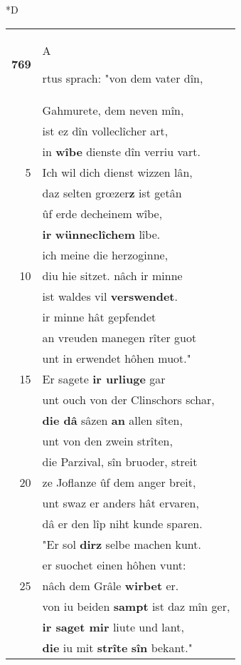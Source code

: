\documentclass[8pt,a4paper,notitlepage]{article}
\begin{document}
\begin{table}[ht]
\begin{minipage}[t]{0.5\linewidth}
\small
\begin{center}*D
\end{center}
\begin{tabular}{rl}
\textbf{769} & \begin{large}A\end{large}rtus sprach: "von dem vater dîn,\\ 
 & Gahmurete, dem neven mîn,\\ 
 & ist ez dîn volleclîcher art,\\ 
 & in \textbf{wîbe} dienste dîn verriu vart.\\ 
5 & Ich wil dich dienst wizzen lân,\\ 
 & daz selten grœzer\textbf{z} ist getân\\ 
 & ûf erde decheinem wîbe,\\ 
 & \textbf{ir} \textbf{wünneclîchem} lîbe.\\ 
 & ich meine die herzoginne,\\ 
10 & diu hie sitzet. nâch ir minne\\ 
 & ist waldes vil \textbf{verswendet}.\\ 
 & ir minne hât gepfendet\\ 
 & an vreuden manegen rîter guot\\ 
 & unt in erwendet hôhen muot."\\ 
15 & Er sagete \textbf{ir urliuge} gar\\ 
 & unt ouch von der Clinschors schar,\\ 
 & \textbf{die dâ} sâzen \textbf{an} allen sîten,\\ 
 & unt von den zwein strîten,\\ 
 & die Parzival, sîn bruoder, streit\\ 
20 & ze Joflanze ûf dem anger breit,\\ 
 & unt swaz er anders hât ervaren,\\ 
 & dâ er den lîp niht kunde sparen.\\ 
 & "Er sol \textbf{dirz} selbe machen kunt.\\ 
 & er suochet einen hôhen vunt:\\ 
25 & nâch dem Grâle \textbf{wirbet} er.\\ 
 & von iu beiden \textbf{sampt} ist daz mîn ger,\\ 
 & \textbf{ir saget mir} liute und lant,\\ 
 & \textbf{die} iu mit \textbf{strîte} \textbf{sîn} bekant."\\ 

\end{tabular}
\end{minipage}
\end{table}
\end{document}

